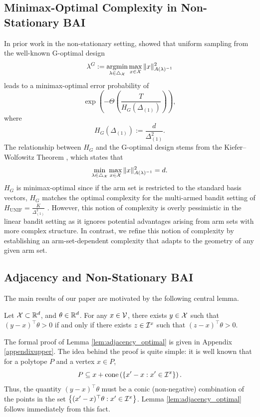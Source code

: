 \subsection{Minimax-Optimal Complexity in Non-Stationary BAI}
In prior work in the non-stationary setting, \citet{xiong2024b} showed that uniform sampling from the well-known G-optimal design \citep{lattimore2020bandit}
\begin{equation}\label{eq:g-optimal}
    \lambda^{G} := \operatorname*{argmin}_{\lambda \in \triangle_{\mathcal{X}}} \max_{x\in\mathcal{X}}\|x\|^2_{A(\lambda)^{-1}}
\end{equation}
leads to a minimax-optimal error probability of \begin{equation}
    \exp\left(-\Theta\left(\frac{T} {H_{G}\left(\Delta_{(1)}\right)} \right)\right),\end{equation} where \begin{equation}
    H_{G}\left(\Delta_{(1)}\right) := \frac{d}{\Delta_{(1)}^2}.
\end{equation} The relationship between $H_{G}$ and the G-optimal design stems from the Kiefer–Wolfowitz Theorem \citep{lattimore2020bandit}, which states that \begin{equation}\label{eq:kiefer}
    \min_{\lambda \in \triangle_{\mathcal{X}}} \max_{x\in\mathcal{X}}\|x\|^2_{A(\lambda)^{-1}} = d.
\end{equation} $H_{G}$ is minimax-optimal since if the arm set is restricted to the standard basis vectors, $H_{G}$ matches the optimal complexity for the multi-armed bandit setting of $H_{\mathrm{UNIF}} = \frac{K}{\Delta_{(1)}^2}$ \citep{abbasi2018best}. However, this notion of complexity is overly pessimistic in the linear bandit setting as it ignores potential advantages arising from arm sets with more complex structure. In contrast, we refine this notion of complexity by establishing an arm-set-dependent complexity that adapts to the geometry of any given arm set.

\subsection{Adjacency and Non-Stationary BAI}
The main results of our paper are motivated by the following central lemma.
\begin{lemma}\label{lem:adjacency_optimal}
    Let $\mathcal{X} \subset \mathbb{R}^d$, and $\theta\in\mathbb{R}^d$. For any $x \in \mathcal{V}$, there exists $y \in  \mathcal{X} $ such that $(y-x)^\top \theta > 0$ if and only if there exists $z \in \mathcal{I}^x$ such that $(z-x)^\top \theta > 0$.
\end{lemma}
 The formal proof of Lemma \ref{lem:adjacency_optimal} is given in Appendix \ref{appendixupper}. The idea behind the proof is quite simple: it is well known \citep{Ziegler1995} that for a polytope $P$ and a vertex $x \in P$,
\begin{equation}\label{eq:cone}
    P \subseteq x+ \mathrm{cone}\left( \left\{x'-x : x' \in \mathcal{I}^x\right\} \right).
\end{equation}
Thus, the quantity $(y-x)^\top \theta$ must be a conic (non-negative) combination of the points in the set $\left\{(x'-x)^\top\theta : x'\in \mathcal{I}^x\right\}$. Lemma \ref{lem:adjacency_optimal} follows immediately from this fact.

